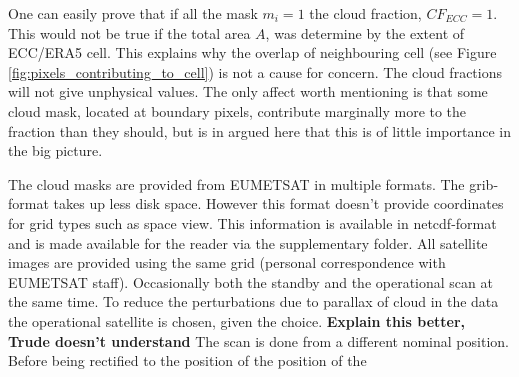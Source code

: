 One can easily prove that if all the mask $m_i = 1$ the cloud fraction, $CF_{ECC}=1$. This would not be true if the total area $A$, was determine by the extent of ECC/ERA5 cell. This explains why the overlap of neighbouring cell (see Figure \ref{fig:pixels_contributing_to_cell}) is not a cause for concern. The cloud fractions will not give unphysical values. The only affect worth mentioning is that some cloud mask, located at boundary pixels, contribute marginally more to the fraction than they should, but is in argued here that this is of little importance in the big picture.



The cloud masks are provided from EUMETSAT in multiple formats. The \acrshort{grib}-format takes up less disk space. However this format doesn't provide coordinates for grid types such as space view. This information is available in \acrshort{netcdf}-format and is made available for the reader via the supplementary folder. All satellite images are provided using the same grid (personal correspondence with EUMETSAT staff). Occasionally both the standby and the operational scan at the same time. To reduce the perturbations due to parallax of cloud in the data the operational satellite is chosen, given the choice. \textbf{Explain this better, Trude doesn't understand} The scan is done from a different nominal position. Before being rectified to the position of the position of the 

